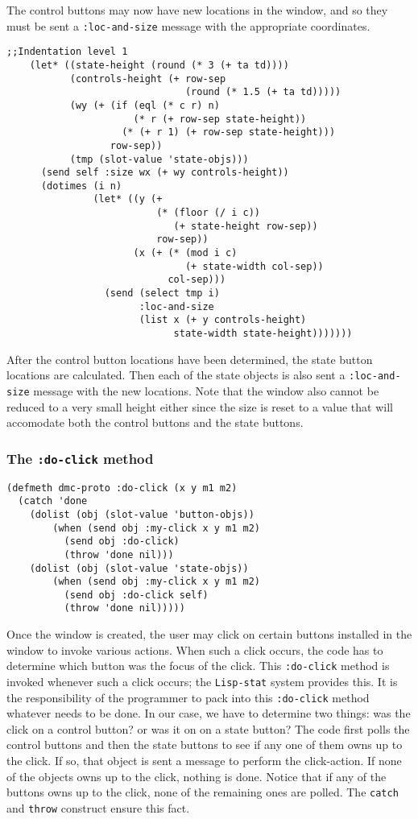 The control buttons may now have new locations in the window, and so
they must be sent a {\tt :loc-and-size} message with the appropriate
coordinates.  
\begin{verbatim}
;;Indentation level 1
    (let* ((state-height (round (* 3 (+ ta td))))
           (controls-height (+ row-sep 
                               (round (* 1.5 (+ ta td)))))
           (wy (+ (if (eql (* c r) n)
                      (* r (+ row-sep state-height))
                    (* (+ r 1) (+ row-sep state-height))) 
                  row-sep))
           (tmp (slot-value 'state-objs)))
      (send self :size wx (+ wy controls-height))
      (dotimes (i n)
               (let* ((y (+ 
                          (* (floor (/ i c)) 
                             (+ state-height row-sep)) 
                          row-sep))
                      (x (+ (* (mod i c) 
                               (+ state-width col-sep)) 
                            col-sep)))
                 (send (select tmp i) 
                       :loc-and-size 
                       (list x (+ y controls-height) 
                             state-width state-height)))))))
\end{verbatim}
After the control button locations have been determined, the state
button locations are calculated.  Then each of the state objects is
also sent a {\tt :loc-and-size} message with the new locations.  Note
that the window also cannot be reduced to a very small height either
since the size is reset to a value that will accomodate both the
control buttons and the state buttons. 

\subsubsection{The {\tt :do-click} method}
\label{subsubsec:dmc-do-click}
\begin{verbatim}
(defmeth dmc-proto :do-click (x y m1 m2)
  (catch 'done
    (dolist (obj (slot-value 'button-objs))
	    (when (send obj :my-click x y m1 m2)
		  (send obj :do-click)
		  (throw 'done nil)))
    (dolist (obj (slot-value 'state-objs))
	    (when (send obj :my-click x y m1 m2)
		  (send obj :do-click self)
		  (throw 'done nil)))))
\end{verbatim}
Once the window is created, the user may click on certain buttons
installed in the window to invoke various actions.  When such a click
occurs, the code has to determine which button was the focus of the
click. This {\tt :do-click} method is invoked whenever such a click
occurs; the {\tt Lisp-stat} system provides this. It is the
responsibility of the programmer to pack into this {\tt :do-click}
method whatever needs to be done.  In our case, we have to determine
two things: was the click on a control button? or was it on on a state
button?  The code first polls the control buttons and then the state
buttons to see if any one of them owns up to the click.  If so, that
object is sent a message to perform the click-action.  If none of the
objects owns up to the click, nothing is done. Notice that if any of
the  buttons owns up to the click, none of the remaining ones are
polled. The {\tt catch} and {\tt throw} construct ensure this fact.

